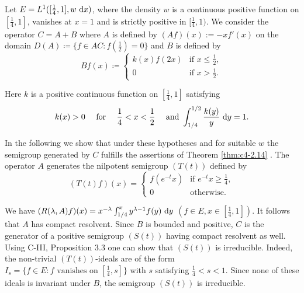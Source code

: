 \begin{example}\label{ex:c4-2.15}
Let $E = L^{1}([\frac{1}{4},1],w\,\mathop{}\!\mathrm{d}{x})$, where the density $w$ is a continuous positive function on $[\frac{1}{4},1]$, vanishes at $x = 1$ and is strictly positive in $[\frac{1}{4},1)$.
We consider the operator $C = A + B$ where $A$ is defined by $(Af)(x) := -xf'(x)$ on the domain $D(A) \coloneqq \{f \in AC : f(\frac{1}{2}) = 0\}$ and $B$ is defined by
\begin{equation*}\label{eq:c4-2.12-kgk}
Bf(x) \coloneqq \begin{cases}
    k(x)f(2x) & \text{if } x \leq \frac{1}{2}, \\
    0 & \text{if } x > \frac{1}{2}.
\end{cases}
\end{equation*}

Here $k$ is a positive continuous function on $[\frac{1}{4},1]$ satisfying
\begin{equation}\label{eq:c4-2.13}
k(x) > 0 \quad \text{ for } \quad \frac{1}{4} < x < \frac{1}{2} \quad \text{ and }  \int_{1/4}^{1/2} \frac{k(y)}{y} \, \mathop{}\!\mathrm{d}{y} = 1.
\end{equation}

In the following we show that under these hypotheses and for suitable $w$ the semigroup generated by $C$ fulfills the assertions of Theorem \ref{thm:c4-2.14} .
The operator $A$ generates the nilpotent semigroup $(T(t))$ defined by
\begin{equation*}\label{eq:c4-2.13-kgk}
(T(t)f)(x) = \begin{cases}
    f(e^{-t}x) & \text{if } e^{-t}x \geq \frac{1}{4}, \\
    0 & \text{otherwise}.
\end{cases}
\end{equation*}

We have $(R(\lambda,A)f)(x) = x^{-\lambda}\int_{1/4}^{x} y^{\lambda-1}f(y) \, \mathop{}\!\mathrm{d}{y}$ $(f \in E, x \in [\frac{1}{4},1])$.
It follows that $A$ has compact resolvent.
Since $B$ is bounded and positive, $C$ is the generator of a positive semigroup $(S(t))$ having compact resolvent as well.
Using C-III, Proposition 3.3 one can show that $(S(t))$ is irreducible.
Indeed, the non-trivial $(T(t))$-ideals are of the form $I_{s} = \{f \in E : f \text{ vanishes on } [\frac{1}{4},s]\}$ with $s$ satisfying $\frac{1}{4} < s < 1$.
Since none of these ideals is invariant under $B$, the semigroup $(S(t))$ is irreducible.


\end{example}
